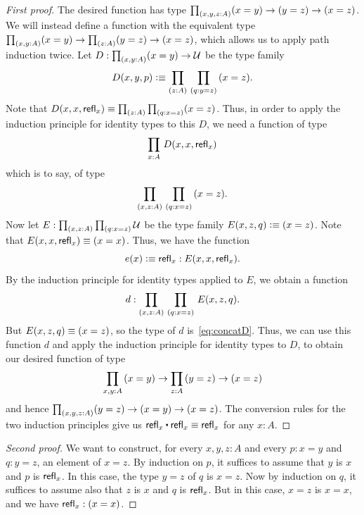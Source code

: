 \begin{proof}[First proof]
  The desired function has type $\prd{x,y,z:A} (x= y) \to   (y= z)\to (x=  z)$.
  We will instead define a function with the equivalent type $\prd{x,y:A} (x= y) \to \prd{z:A} (y= z)\to (x=  z)$, which allows us to apply path induction twice.
  Let $D:\prd{x,y:A} (x=y) \to \type$ be the type family
  \begin{equation*}
    D(x,y,p)\defeq \prd{z:A}{q:y=z} (x=z).
  \end{equation*}
  Note that $D(x,x,\refl x) \jdeq \prd{z:A}{q:x=z} (x=z)$.
  Thus, in order to apply the induction principle for identity types to this $D$, we need a function of type
  \begin{equation}\label{eq:concatD}
    \prd{x:A} D(x,x,\refl{x})
  \end{equation}
  which is to say, of type
  \[ \prd{x,z:A}{q:x=z} (x=z). \]
  Now let $E:\prd{x,z:A}{q:x=z}\type$ be the type family $E(x,z,q)\vcentcolon\equiv (x=z)$.
  Note that $E(x,x,\mathsf{refl}_{x}) \equiv (x=x)$.
  Thus, we have the function
  \begin{equation*}
    e(x) \vcentcolon\equiv \mathsf{refl}_{x} : E(x,x,\mathsf{refl}_{x}).
  \end{equation*}
  By the induction principle for identity types applied to $E$, we obtain a function
  \begin{equation*}
    d : \prd{x,z:A}{q:x=z} E(x,z,q).
  \end{equation*}
  But $E(x,z,q)\equiv (x=z)$, so the type of $d$ is~\eqref{eq:concatD}.
  Thus, we can use this function $d$ and apply the induction principle for identity types to $D$, to obtain our desired function of type
  \begin{equation*}
    \prd{x,y:A} (x= y) \to \prd{z:A} (y= z)\to (x=  z)
  \end{equation*}
  and hence $\prd{x,y,z:A} (y=z) \to (x=y) \to (x=z)$.
  The conversion rules for the two induction principles give us $\refl{x}\ct \refl{x}\jdeq \refl{x}$ for any $x:A$.
\end{proof}

\begin{proof}[Second proof]
  We want to construct, for every $x,y,z:A$ and every $p:x=y$ and $q:y=z$, an element of $x=z$.
  By induction on $p$, it suffices to assume that $y$ is $x$ and $p$ is $\mathsf{refl}_{x}$.
  In this case, the type $y=z$ of $q$ is $x=z$.
  Now by induction on $q$, it suffices to assume also that $z$ is $x$ and $q$ is $\mathsf{refl}_{x}$.
  But in this case, $x=z$ is $x=x$, and we have $\mathsf{refl}_{x}:(x=x)$.
\end{proof}

